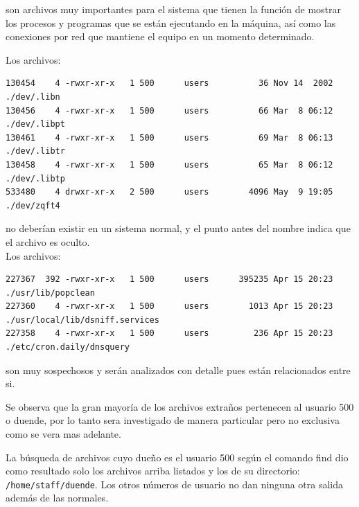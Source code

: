 \vspace{1em}

son archivos muy importantes para el sistema que tienen
la función de mostrar los procesos y programas que se están ejecutando
en la máquina, así como las conexiones por red que mantiene el equipo
en un momento determinado.
 
 Los archivos:


\vspace{1em}

\begin{lstlisting}[style=terminal]
130454    4 -rwxr-xr-x   1 500      users          36 Nov 14  2002 ./dev/.libn
130456    4 -rwxr-xr-x   1 500      users          66 Mar  8 06:12 ./dev/.libpt
130461    4 -rwxr-xr-x   1 500      users          69 Mar  8 06:13 ./dev/.libtr
130458    4 -rwxr-xr-x   1 500      users          65 Mar  8 06:12 ./dev/.libtp
533480    4 drwxr-xr-x   2 500      users        4096 May  9 19:05 ./dev/zqft4
\end{lstlisting}

\vspace{1em}

no deberían existir en un sistema normal, y el punto antes del nombre
indica que el archivo es oculto.\\

 Los archivos:

\vspace{1em}

\begin{lstlisting}[style=terminal]
227367  392 -rwxr-xr-x   1 500      users      395235 Apr 15 20:23 ./usr/lib/popclean
227360    4 -rwxr-xr-x   1 500      users        1013 Apr 15 20:23 ./usr/local/lib/dsniff.services
227358    4 -rwxr-xr-x   1 500      users         236 Apr 15 20:23 ./etc/cron.daily/dnsquery
\end{lstlisting}

\vspace{1em}

son muy sospechosos y serán analizados con detalle pues están
relacionados entre si.

 Se observa que la gran mayoría de los archivos extraños pertenecen al
usuario 500 o duende, por lo tanto sera investigado de manera
particular pero no exclusiva como se vera mas adelante.

La búsqueda de archivos cuyo dueño es el usuario 500 según el comando find
dio como resultado solo los archivos arriba listados y los de su
directorio: \texttt{/home/staff/duende}. Los otros números de usuario no dan
ninguna otra salida además de las normales.

